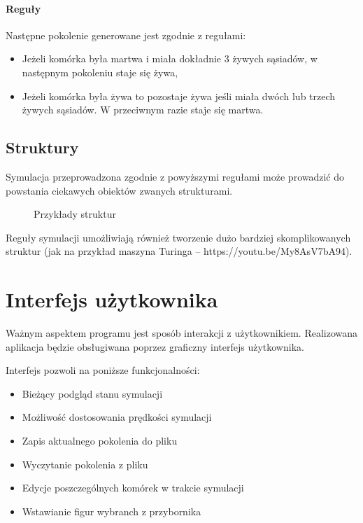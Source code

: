 \documentclass{report}
\begin{document}
\paragraph{Reguły} Następne pokolenie generowane jest zgodnie z regułami:
\begin{itemize}
\item Jeżeli komórka była martwa i miała dokładnie 3 żywych sąsiadów, w następnym pokoleniu staje się żywa,
\item Jeżeli komórka była żywa to pozostaje żywa jeśli miała dwóch lub trzech żywych sąsiadów. W przeciwnym razie staje się martwa.
\end{itemize}

\subsection{Struktury}
Symulacja przeprowadzona zgodnie z powyższymi regułami może prowadzić do powstania ciekawych obiektów zwanych strukturami. 

\begin{figure}[h]
\centering
\setlength{\fboxsep}{0pt} %
\setlength{\fboxrule}{1pt} %
\caption{Przykłady struktur}
\end{figure}

Reguły symulacji umożliwiają również tworzenie dużo bardziej skomplikowanych struktur (jak na przykład maszyna Turinga -- https://youtu.be/My8AsV7bA94).

\section{Interfejs użytkownika}
\label{sec:opis-interfejs}
Ważnym aspektem programu jest sposób interakcji z użytkownikiem.
Realizowana aplikacja będzie obsługiwana poprzez graficzny interfejs użytkownika.

Interfejs pozwoli na poniższe funkcjonalności:
\begin{itemize}
    \item Bieżący podgląd stanu symulacji
    \item Możliwość dostosowania prędkości symulacji
    \item Zapis aktualnego pokolenia do pliku
    \item Wyczytanie pokolenia z pliku
    \item Edycje poszczególnych komórek w trakcie symulacji
    \item Wstawianie figur wybranch z przybornika
\end{itemize}
\end{document}

